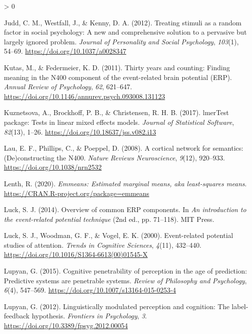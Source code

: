 \documentclass[
  english,
  doc,12pt,twoside,floatsintext]{apa7}
\newlength{\cslhangindent}
\newenvironment{CSLReferences}[2] %
 {%
  \setlength{\parindent}{0pt}
  \ifodd #1 \everypar{\setlength{\hangindent}{\cslhangindent}}\ignorespaces\fi
  \ifnum #2 > 0
  \setlength{\parskip}{#2\baselineskip}
  \fi
 }%
 {}
\begin{document}
\begin{CSLReferences}{1}{0}
\leavevmode\hypertarget{ref-judd2012}{}%
Judd, C. M., Westfall, J., \& Kenny, D. A. (2012). Treating stimuli as a random factor in social psychology: A new and comprehensive solution to a pervasive but largely ignored problem. \emph{Journal of Personality and Social Psychology}, \emph{103}(1), 54--69. \url{https://doi.org/10.1037/a0028347}

\leavevmode\hypertarget{ref-kutas2011}{}%
Kutas, M., \& Federmeier, K. D. (2011). Thirty years and counting: Finding meaning in the {N400} component of the event-related brain potential ({ERP}). \emph{Annual Review of Psychology}, \emph{62}, 621--647. \url{https://doi.org/10.1146/annurev.psych.093008.131123}

\leavevmode\hypertarget{ref-R-lmerTest}{}%
Kuznetsova, A., Brockhoff, P. B., \& Christensen, R. H. B. (2017). {lmerTest} package: Tests in linear mixed effects models. \emph{Journal of Statistical Software}, \emph{82}(13), 1--26. \url{https://doi.org/10.18637/jss.v082.i13}

\leavevmode\hypertarget{ref-lau2008}{}%
Lau, E. F., Phillips, C., \& Poeppel, D. (2008). A cortical network for semantics: (De)constructing the {N400}. \emph{Nature Reviews Neuroscience}, \emph{9}(12), 920--933. \url{https://doi.org/10.1038/nrn2532}

\leavevmode\hypertarget{ref-R-emmeans}{}%
Lenth, R. (2020). \emph{Emmeans: Estimated marginal means, aka least-squares means}. \url{https://CRAN.R-project.org/package=emmeans}

\leavevmode\hypertarget{ref-luck2014}{}%
Luck, S. J. (2014). Overview of common ERP components. In \emph{An introduction to the event-related potential technique} (2nd ed., pp. 71--118). MIT Press.

\leavevmode\hypertarget{ref-luck2000}{}%
Luck, S. J., Woodman, G. F., \& Vogel, E. K. (2000). Event-related potential studies of attention. \emph{Trends in Cognitive Sciences}, \emph{4}(11), 432--440. \url{https://doi.org/10.1016/S1364-6613(00)01545-X}

\leavevmode\hypertarget{ref-lupyan2015}{}%
Lupyan, G. (2015). Cognitive penetrability of perception in the age of prediction: Predictive systems are penetrable systems. \emph{Review of Philosophy and Psychology}, \emph{6}(4), 547--569. \url{https://doi.org/10.1007/s13164-015-0253-4}

\leavevmode\hypertarget{ref-lupyan2012}{}%
Lupyan, G. (2012). Linguistically modulated perception and cognition: The label-feedback hypothesis. \emph{Frontiers in Psychology}, \emph{3}. \url{https://doi.org/10.3389/fpsyg.2012.00054}


\end{CSLReferences}
\end{document}
